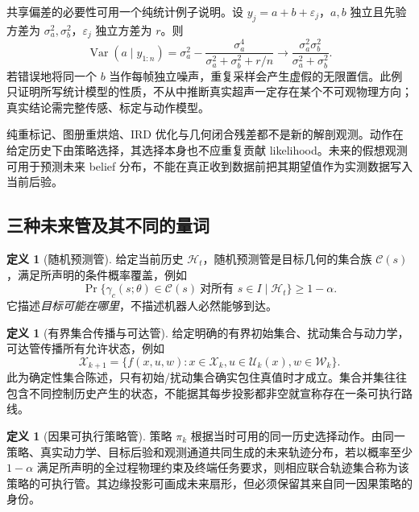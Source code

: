 \documentclass[11pt,a4paper]{article}
\numberwithin{equation}{section}
\theoremstyle{definition}
\newtheorem{definition}[theorem]{定义}
\begin{document}
共享偏差的必要性可用一个纯统计例子说明。设 $y_j=a+b+\varepsilon_j$，$a,b$ 独立且先验方差为 $\sigma_a^2,\sigma_b^2$，$\varepsilon_j$ 独立方差为 $r$。则
\begin{equation}
 \operatorname{Var}(a\mid y_{1:n})
 =\sigma_a^2-
 \frac{\sigma_a^4}{\sigma_a^2+\sigma_b^2+r/n}
 \longrightarrow
 \frac{\sigma_a^2\sigma_b^2}{\sigma_a^2+\sigma_b^2}.
 \label{bel:shared-bias-example}
\end{equation}
若错误地将同一个 $b$ 当作每帧独立噪声，重复采样会产生虚假的无限置信。此例只证明所写统计模型的性质，不从中推断真实超声一定存在某个不可观物理方向；真实结论需完整传感、标定与动作模型。

纯重标记、图册重烘焙、IRD 优化与几何闭合残差都不是新的解剖观测。动作在给定历史下由策略选择，其选择本身也不应重复贡献 likelihood。未来的假想观测可用于预测未来 belief 分布，不能在真正收到数据前把其期望值作为实测数据写入当前后验。

\subsection{三种未来管及其不同的量词}
\label{bel:tubes}

\begin{definition}[随机预测管]
\label{bel:def-prob-tube}
给定当前历史 $\mathcal H_t$，随机预测管是目标几何的集合族 $\mathcal C(s)$，满足所声明的条件概率覆盖，例如
\begin{equation}
 \Pr\{\gamma_c(s;\theta)\in\mathcal C(s)\ \text{对所有 }s\in I
 \mid\mathcal H_t\}\ge1-\alpha.
 \label{bel:joint-coverage}
\end{equation}
它描述\emph{目标可能在哪里}，不描述机器人必然能够到达。
\end{definition}

\begin{definition}[有界集合传播与可达管]
\label{bel:def-reachable}
给定明确的有界初始集合、扰动集合与动力学，可达管传播所有允许状态，例如
\begin{equation}
 \mathcal X_{k+1}=\{f(x,u,w):x\in\mathcal X_k,
 u\in\mathcal U_k(x),w\in\mathcal W_k\}.
 \label{bel:reachable}
\end{equation}
此为确定性集合陈述，只有初始/扰动集合确实包住真值时才成立。集合并集往往包含不同控制历史产生的状态，不能据其每步投影都非空就宣称存在一条可执行路线。
\end{definition}

\begin{definition}[因果可执行策略管]
\label{bel:def-policy-tube}
策略 $\pi_k$ 根据当时可用的同一历史选择动作。由同一策略、真实动力学、目标后验和观测通道共同生成的未来轨迹分布，若以概率至少 $1-\alpha$ 满足所声明的全过程物理约束及终端任务要求，则相应联合轨迹集合称为该策略的可执行管。其边缘投影可画成未来扇形，但必须保留其来自同一因果策略的身份。
\end{definition}
\end{document}

